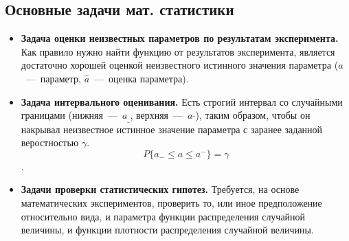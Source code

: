 \documentclass[12pt,a4paper,oneside]{extarticle}
\begin{document}
    \subsection{Основные задачи мат. статистики}
        \begin{itemize}
            \item {\bf Задача оценки неизвестных параметров по результатам эксперимента.}
            Как правило нужно найти функцию от результатов эксперимента, является достаточно хорошей оценкой неизвестного истинного значения параметра ($a$~---~параметр, $\hat{a}$~---~оценка параметра).

            \item {\bf Задача интервального оценивания.}
            Есть строгий интервал со случайными границами (нижняя~---~$a_{\_}$, верхняя~---~$a^{\_}$), таким образом, чтобы он накрывал неизвестное истинное значение параметра с заранее заданной веростностью $\gamma$.
            $$P\{a_{-} \leq a \leq a^{-}\}=\gamma$$.

            \item  {\bf Задачи проверки статистических гипотез.}
            Требуется, на основе математических экспериментов, проверить то, или иное предположение относительно вида, и параметра функции распределения случайной величины, и функции плотности распределения случайной величины.
        \end{itemize}
\end{document}
